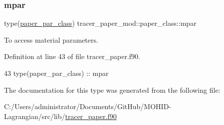 \subsubsection{\texorpdfstring{mpar}{mpar}}
{\footnotesize\ttfamily type(\mbox{\hyperlink{structtracer__paper__mod_1_1paper__par__class}{paper\+\_\+par\+\_\+class}}) tracer\+\_\+paper\+\_\+mod\+::paper\+\_\+class\+::mpar\hspace{0.3cm}{\ttfamily [private]}}



To access material parameters. 



Definition at line 43 of file tracer\+\_\+paper.\+f90.


\begin{DoxyCode}
43         \textcolor{keywordtype}{type}(paper\_par\_class)   :: mpar
\end{DoxyCode}


The documentation for this type was generated from the following file\+:\begin{DoxyCompactItemize}
\item 
C\+:/\+Users/administrator/\+Documents/\+Git\+Hub/\+M\+O\+H\+I\+D-\/\+Lagrangian/src/lib/\mbox{\hyperlink{tracer__paper_8f90}{tracer\+\_\+paper.\+f90}}\end{DoxyCompactItemize}
